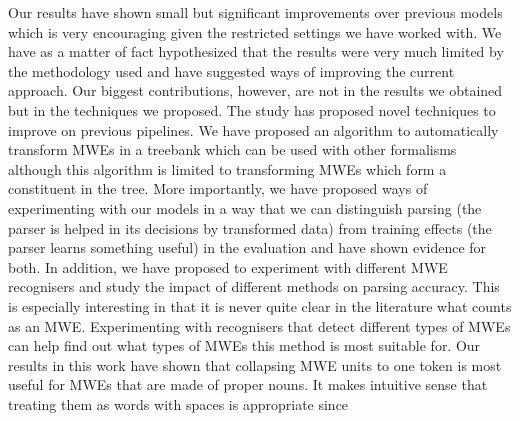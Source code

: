 \documentclass[output=paper]{LSP/langsci}
\begin{document}
{{\ili{}\indent\ili{} Our\ili{} results\ili{} have\ili{} shown\ili{} small\ili{} but\ili{} significant\ili{} improvements\ili{} over\ili{} previous\ili{} models\ili{} which\ili{} is\ili{} very\ili{} encouraging\ili{} given\ili{} the\ili{} restricted\ili{} settings\ili{} we\ili{} have\ili{} worked\ili{} with\ili{}.\ili{} We\ili{} have\ili{} as\ili{} a\ili{} matter\ili{} of\ili{} fact\ili{} hypothesized\ili{} that\ili{} the\ili{} results\ili{} were\ili{} very\ili{} much\ili{} limited\ili{} by\ili{} the\ili{} methodology\ili{} used\ili{} and\ili{} have\ili{} suggested\ili{} ways\ili{} of\ili{} improving\ili{} the\ili{} current\ili{} approach\ili{}.\ili{} Our\ili{} biggest\ili{} contributions\ili{},\ili{} however\ili{},\ili{} are\ili{} not\ili{} in\ili{} the\ili{} results\ili{} we\ili{} obtained\ili{} but\ili{} in\ili{} the\ili{} techniques\ili{} we\ili{} proposed\ili{}.\ili{} The\ili{} study\ili{} has\ili{} proposed\ili{} novel\ili{} techniques\ili{} to\ili{} improve\ili{} on\ili{} previous\ili{} pipelines\ili{}.\ili{} We\ili{} have\ili{} proposed\ili{} an\ili{} algorithm\ili{} to\ili{} automatically\ili{} transform\ili{} MWEs\ili{} in\ili{} a\ili{} treebank\ili{} which\ili{} can\ili{} be\ili{} used\ili{} with\ili{} other\ili{} formalisms\ili{} although\ili{} this\ili{} algorithm\ili{} is\ili{} limited\ili{} to\ili{} transforming\ili{} MWEs\ili{} which\ili{} form\ili{} a\ili{} constituent\ili{} in\ili{} the\ili{} tree\ili{}.\ili{} More\ili{} importantly\ili{},\ili{} we\ili{} have\ili{} proposed\ili{} ways\ili{} of\ili{} experimenting\ili{} with\ili{} our\ili{} models\ili{} in\ili{} a\ili{} way\ili{} that\ili{} we\ili{} can\ili{} distinguish\ili{} parsing\ili{} \ili{}(the\ili{} parser\ili{} is\ili{} helped\ili{} in\ili{} its\ili{} decisions\ili{} by\ili{} transformed\ili{} data\ili{})\ili{} from\ili{} training\ili{} effects\ili{} \ili{}(the\ili{} parser\ili{} learns\ili{} something\ili{} useful\ili{})\ili{} in\ili{} the\ili{} evaluation\ili{} and\ili{} have\ili{} shown\ili{} evidence\ili{} for\ili{} both\ili{}.\ili{} In\ili{} addition\ili{},\ili{} we\ili{} have\ili{} proposed\ili{} to\ili{} experiment\ili{} with\ili{} different\ili{} MWE\ili{} recognisers\ili{} and\ili{} study\ili{} the\ili{} impact\ili{} of\ili{} different\ili{} \ili{}\isi{}\ili{} methods\ili{} on\ili{} parsing\ili{} accuracy\ili{}.\ili{} This\ili{} is\ili{} especially\ili{} interesting\ili{} in\ili{} that\ili{} it\ili{} is\ili{} never\ili{} quite\ili{} clear\ili{} in\ili{} the\ili{} literature\ili{} what\ili{} counts\ili{} as\ili{} an\ili{} MWE\ili{}.\ili{} Experimenting\ili{} with\ili{} recognisers\ili{} that\ili{} detect\ili{} different\ili{} types\ili{} of\ili{} MWEs\ili{} can\ili{} help\ili{} find\ili{} out\ili{} what\ili{} types\ili{} of\ili{} MWEs\ili{} this\ili{} method\ili{} is\ili{} most\ili{} suitable\ili{} for\ili{}.\ili{} Our\ili{} results\ili{} in\ili{} this\ili{} work\ili{} have\ili{} shown\ili{} that\ili{} collapsing\ili{} MWE\ili{} units\ili{} to\ili{} one\ili{} token\ili{} is\ili{} most\ili{} useful\ili{} for\ili{} MWEs\ili{} that\ili{} are\ili{} made\ili{} of\ili{} proper\ili{} nouns\ili{}.\ili{} It\ili{} makes\ili{} intuitive\ili{} sense\ili{} that\ili{} treating\ili{} them\ili{} as\ili{} words\ili{} with\ili{} spaces\ili{} is\ili{} appropriate\ili{} since\ili{} }}
\end{document}
